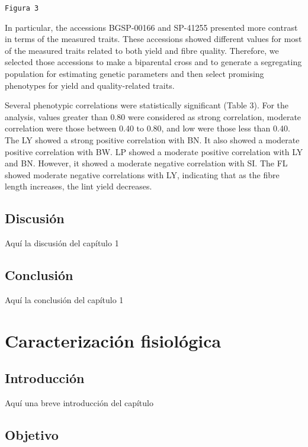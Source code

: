 \documentclass[12pt,oneside]{reedthesis}
\begin{document}
\texttt{Figura\ 3}

In particular, the accessions BGSP-00166 and SP-41255 presented more contrast in terms of the measured traits. These accessions showed different values for most of the measured traits related to both yield and fibre quality. Therefore, we selected those accessions to make a biparental cross and to generate a segregating population for estimating genetic parameters and then select promising phenotypes for yield and quality-related traits.

Several phenotypic correlations were statistically significant (Table 3). For the analysis, values greater than 0.80 were considered as strong correlation, moderate correlation were those between 0.40 to 0.80, and low were those less than 0.40. The LY showed a strong positive correlation with BN. It also showed a moderate positive correlation with BW. LP showed a moderate positive correlation with LY and BN. However, it showed a moderate negative correlation with SI. The FL showed moderate negative correlations with LY, indicating that as the fibre length increases, the lint yield decreases.

\section{Discusión}\label{discusiuxf3n}

Aquí la discusión del capítulo 1

\section{Conclusión}\label{conclusiuxf3n}

Aquí la conclusión del capítulo 1

\chapter{Caracterización fisiológica}\label{math-sci}

\section{Introducción}\label{introducciuxf3n-2}

Aquí una breve introducción del capítulo

\section{Objetivo}\label{objetivo-1}
\end{document}
